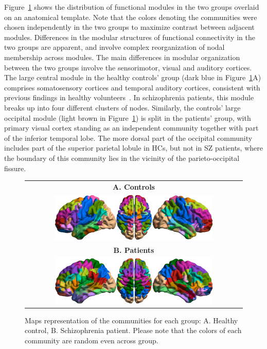 Figure~\ref{fig:schizo_figure5} shows the distribution of functional modules in the two groups overlaid on an anatomical template.
Note that the colors denoting the communities were chosen independently in the two groups to maximize contrast between adjacent modules.
Differences in the modular structures of functional connectivity in the two groups are apparent, and involve complex reorganization of nodal membership across modules.
The main differences in modular organization between the two groups involve the sensorimotor, visual and auditory cortices.
The large central module in the healthy controls' group (dark blue in Figure~\ref{fig:schizo_figure5}A) comprises somatosensory cortices and temporal auditory cortices, consistent with previous findings in healthy volunteers~\cite{javitt2015}.
In schizophrenia patients, this module breaks up into four different clusters of nodes.
Similarly, the controls' large occipital module (light brown in Figure~\ref{fig:schizo_figure5}) is split in the patients' group, with primary visual cortex standing as an independent community together with part of the inferior temporal lobe.
The more dorsal part of the occipital community includes part of the superior parietal lobule in HCs, but not in SZ patients, where the boundary of this community lies in the vicinity of the parieto-occipital fissure.

\begin{figure}
\centering
    \begin{tabular}{c}
    \textbf{\textsf{A. Controls}} \\
	\includegraphics[width=0.75\textwidth]{images/schizo/schizo_fig_5a.jpg} \\
	\textbf{\textsf{B. Patients}} \\
	\includegraphics[width=0.75\textwidth]{images/schizo/schizo_fig_5b.jpg} \\
	\end{tabular}
\caption{Maps representation of the communities for each group: A. Healthy control, B. Schizophrenia patient. Please note that the colors of each community are random even across group.}
\label{fig:schizo_figure5}
\end{figure}

